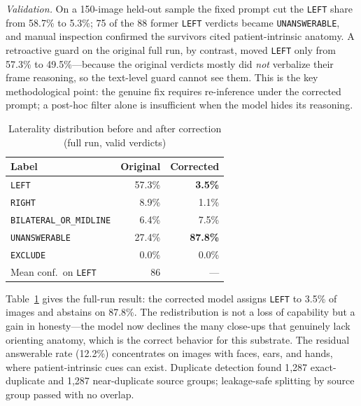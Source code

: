 \documentclass[conference]{IEEEtran}
\begin{document}
\emph{Validation.} On a 150-image held-out sample the fixed prompt cut the \texttt{LEFT} share from 58.7\% to 5.3\%; 75 of the 88 former \texttt{LEFT} verdicts became \texttt{UNANSWERABLE}, and manual inspection confirmed the survivors cited patient-intrinsic anatomy. A retroactive guard on the original full run, by contrast, moved \texttt{LEFT} only from 57.3\% to 49.5\%---because the original verdicts mostly did \emph{not} verbalize their frame reasoning, so the text-level guard cannot see them. This is the key methodological point: the genuine fix requires re-inference under the corrected prompt; a post-hoc filter alone is insufficient when the model hides its reasoning.

\begin{table}[!t]
\caption{Laterality distribution before and after correction (full run, valid verdicts)}
\label{tab:dist}
\centering
\begin{tabular}{@{}lrr@{}}
\toprule
Label & Original & Corrected\\
\midrule
\texttt{LEFT} & 57.3\% & \textbf{3.5\%}\\
\texttt{RIGHT} & 8.9\% & 1.1\%\\
\texttt{BILATERAL\_OR\_MIDLINE} & 6.4\% & 7.5\%\\
\texttt{UNANSWERABLE} & 27.4\% & \textbf{87.8\%}\\
\texttt{EXCLUDE} & 0.0\% & 0.0\%\\
\midrule
Mean conf.\ on \texttt{LEFT} & 86 & ---\\
\bottomrule
\end{tabular}
\end{table}

Table~\ref{tab:dist} gives the full-run result: the corrected model assigns \texttt{LEFT} to 3.5\% of images and abstains on 87.8\%. The redistribution is not a loss of capability but a gain in honesty---the model now declines the many close-ups that genuinely lack orienting anatomy, which is the correct behavior for this substrate. The residual answerable rate (12.2\%) concentrates on images with faces, ears, and hands, where patient-intrinsic cues can exist. Duplicate detection found 1{,}287 exact-duplicate and 1{,}287 near-duplicate source groups; leakage-safe splitting by source group passed with no overlap.
\end{document}
